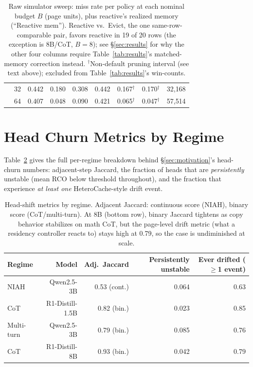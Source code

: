 \documentclass{article}
\begin{document}
\begin{table}[h]
\begin{tabular}{llrrrrrrr}
                   & 32 & 0.442 & 0.180 & 0.308 & 0.442 & 0.167$^\dagger$ & 0.170$^\dagger$ & 32{,}168 \\
                   & 64 & 0.407 & 0.048 & 0.090 & 0.421 & 0.065$^\dagger$ & 0.047$^\dagger$ & 57{,}514 \\
\bottomrule
\end{tabular}
\caption{Raw simulator sweep: miss rate per policy at each nominal
budget $B$ (page units), plus reactive's realized memory (``Reactive
mem''). Reactive vs.\ Evict, the one same-row-comparable pair, favors
reactive in 19 of 20 rows (the exception is 8B/CoT, $B{=}8$); see
\S\ref{sec:results} for why the other four columns require
Table~\ref{tab:results}'s matched-memory correction instead.
$^\dagger$Non-default pruning interval (see text above); excluded from
Table~\ref{tab:results}'s win-counts.}
\label{tab:appendix-sweep}
\end{table}

\clearpage
\section{Head Churn Metrics by Regime}
\label{sec:appendix-churn}

Table~\ref{tab:churn} gives the full per-regime breakdown behind
\S\ref{sec:motivation}'s head-churn numbers: adjacent-step Jaccard, the
fraction of heads that are \emph{persistently} unstable (mean RCO
below threshold throughout), and the fraction that experience
\emph{at least one} HeteroCache-style drift event.

\begin{table}[h]
\centering
\small
\begin{tabular}{lrrrr}
\toprule
Regime & Model & Adj.~Jaccard & Persistently unstable & Ever drifted ($\geq$1 event) \\
\midrule
NIAH & Qwen2.5-3B & 0.53 (cont.) & 0.064 & 0.63 \\
CoT & R1-Distill-1.5B & 0.82 (bin.) & 0.023 & 0.85 \\
Multi-turn & Qwen2.5-3B & 0.79 (bin.) & 0.085 & 0.76 \\
\midrule
CoT & R1-Distill-8B & 0.93 (bin.) & 0.042 & 0.79 \\
\bottomrule
\end{tabular}
\caption{Head-shift metrics by regime. Adjacent Jaccard: continuous
score (NIAH), binary score (CoT/multi-turn). At 8B (bottom row), binary
Jaccard tightens as copy behavior stabilizes on math CoT, but the
page-level drift metric (what a residency controller reacts to)
stays high at 0.79, so the case is undiminished at scale.}
\label{tab:churn}
\end{table}
\end{document}
